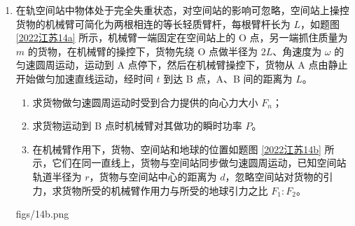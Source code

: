 \documentclass[\gkver]{gaokaozhenti}
\begin{document}
\begin{enumerate}
{\begin{enumerate}
	\item
	中性粒子在 A 点分裂成带等量异号电荷的粒子 a 和 b，分裂过程中，没有外力作用，动量守恒，根据动量守恒定律 $mv = m_{a}v_{a} + m_{b}v_{b}$。

	因为分裂后动量关系为 $m_{a}v_{a}:m_{b}v_{b}=6:1$，联立解得 $p_{a}=m_{a}v_{a}=\frac{6}{7}mv$。
\end{enumerate}
}

\item
在轨空间站中物体处于完全失重状态，对空间站的影响可忽略，空间站上操控货物的机械臂可简化为两根相连的等长轻质臂杆，每根臂杆长为 $L$，如题图 \ref{2022江苏14a} 所示，机械臂一端固定在空间站上的 O 点，另一端抓住质量为 $m$ 的货物，在机械臂的操控下，货物先绕 O 点做半径为 $2L$、角速度为 $\omega$ 的匀速圆周运动，运动到 A 点停下，然后在机械臂操控下，货物从 A 点由静止开始做匀加速直线运动，经时间 $t$ 到达 B 点，A、B 间的距离为 $L$。
\begin{enumerate}
	\item
	求货物做匀速圆周运动时受到合力提供的向心力大小 $F_{n}$；
	\item
	求货物运动到 B 点时机械臂对其做功的瞬时功率 $P$。
	\item
	在机械臂作用下，货物、空间站和地球的位置如题图 \ref{2022江苏14b} 所示，它们在同一直线上，货物与空间站同步做匀速圆周运动，已知空间站轨道半径为 $r$，货物与空间站中心的距离为 $d$，忽略空间站对货物的引力，求货物所受的机械臂作用力与所受的地球引力之比 $F_{1}:F_{2}$。
\end{enumerate}
{figs/14b.png}


\end{enumerate}
\end{document}
